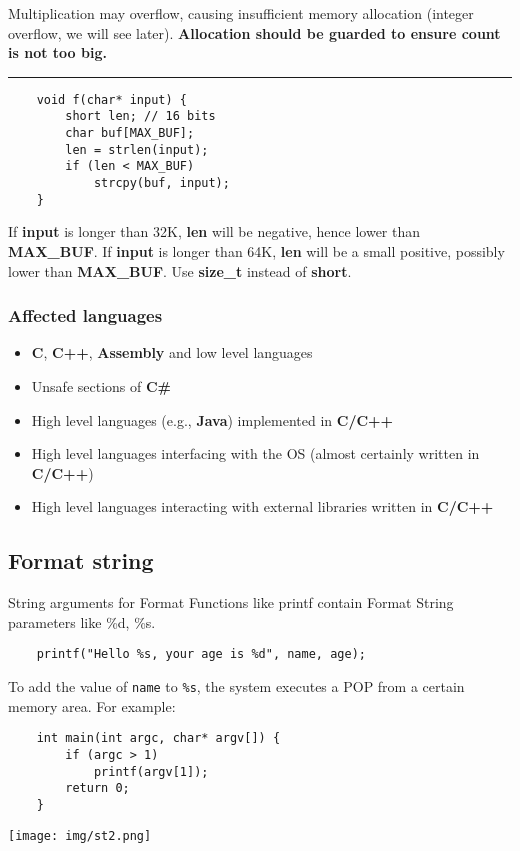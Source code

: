 \documentclass[a4paper, 10pt, titlepage]{article}
\begin{document}
Multiplication may overflow, causing insufficient memory allocation (integer overflow, we will see later).\textbf{ Allocation should be guarded to ensure count is not too big.}
\\\noindent\rule{10cm}{0.4pt}
\begin{lstlisting}
	void f(char* input) {
		short len; // 16 bits
		char buf[MAX_BUF];
		len = strlen(input);
		if (len < MAX_BUF)
			strcpy(buf, input);
	}
\end{lstlisting}
If \textbf{input} is longer than 32K, \textbf{len} will be negative, hence lower than \textbf{MAX\_BUF}. If \textbf{input} is longer than 64K, \textbf{len} will be a small positive, possibly lower than \textbf{MAX\_BUF}. Use \textbf{size\_t} instead of \textbf{short}. \medskip
\subsubsection*{Affected languages}
\begin{itemize}
\item \textbf{C}, \textbf{C++}, \textbf{Assembly} and low level languages
\item Unsafe sections of \textbf{C\#}
\item High level languages (e.g., \textbf{Java}) implemented in \textbf{C/C++}
\item High level languages interfacing with the OS (almost certainly
written in \textbf{C/C++})
\item High level languages interacting with external libraries written in \textbf{C/C++}
\end{itemize}
\newpage
\subsection{Format string}
String arguments for Format Functions like printf contain Format String parameters like \%d, \%s.
\begin{lstlisting}
	printf("Hello %s, your age is %d", name, age);
\end{lstlisting}
To add the value of \lstinline|name| to \lstinline|%s|, the system executes a POP from a certain memory area. For example:\\
\begin{minipage}{0.7\textwidth}
\begin{lstlisting}
	int main(int argc, char* argv[]) {
		if (argc > 1)
			printf(argv[1]);
		return 0;
	}
\end{lstlisting}
\end{minipage}
\begin{minipage}{0.25\textwidth}
\texttt{[image: img/st2.png]}
\end{minipage}
\end{document}
